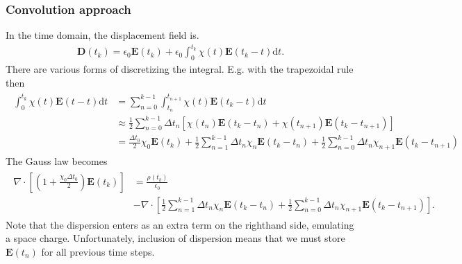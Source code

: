 \documentclass[letterpaper,10pt,english]{sphinxmanual}
\begin{document}
\subsubsection{Convolution approach}
\label{\detokenize{Solvers/Electrostatics:convolution-approach}}
\sphinxAtStartPar
In the time domain, the displacement field is.
\begin{equation*}
\begin{split}\mathbf{D}(t_k) = \epsilon_0\mathbf{E}(t_k) + \epsilon_0\int_0^{t_k} \chi(t)\mathbf{E}(t_k-t)\text{d}t.\end{split}
\end{equation*}
\sphinxAtStartPar
There are various forms of discretizing the integral.
E.g. with the trapezoidal rule then
\begin{equation*}
\begin{split}\begin{split}
\int_0^{t_k}\chi(t)\mathbf{E}(t-t)\text{d}t &= \sum_{n=0}^{k-1} \int_{t_n}^{t_{n+1}}\chi(t)\mathbf{E}(t_k-t)\text{d}t \\
&\approx \frac{1}{2}\sum_{n=0}^{k-1}\Delta t_n\left[\chi(t_n)\mathbf{E}(t_k-t_n) + \chi(t_{n+1})\mathbf{E}(t_k-t_{n+1})\right] \\
&= \frac{\Delta t_0}{2}\chi_0\mathbf{E}(t_k) + \frac{1}{2}\sum_{n=1}^{k-1}\Delta t_n\chi_n\mathbf{E}(t_k-t_n) + \frac{1}{2}\sum_{n=0}^{k-1}\Delta t_n\chi_{n+1}\mathbf{E}(t_k-t_{n+1})
\end{split}\end{split}
\end{equation*}
\sphinxAtStartPar
The Gauss law becomes
\begin{equation*}
\begin{split}\begin{split}
\nabla\cdot\left[\left(1+\frac{\chi_0\Delta t_0}{2}\right)\mathbf{E}(t_k)\right] &= \frac{\rho(t_k)}{\epsilon_0}\\
&- \nabla\cdot\left[\frac{1}{2}\sum_{n=1}^{k-1}\Delta t_n\chi_n\mathbf{E}(t_k-t_n) + \frac{1}{2}\sum_{n=0}^{k-1}\Delta t_n\chi_{n+1}\mathbf{E}(t_k-t_{n+1})\right].
\end{split}\end{split}
\end{equation*}
\sphinxAtStartPar
Note that the dispersion enters as an extra term on the right\sphinxhyphen{}hand side, emulating a space charge.
Unfortunately, inclusion of dispersion means that we must store \(\mathbf{E}(t_n)\) for all previous time steps.
\end{document}

